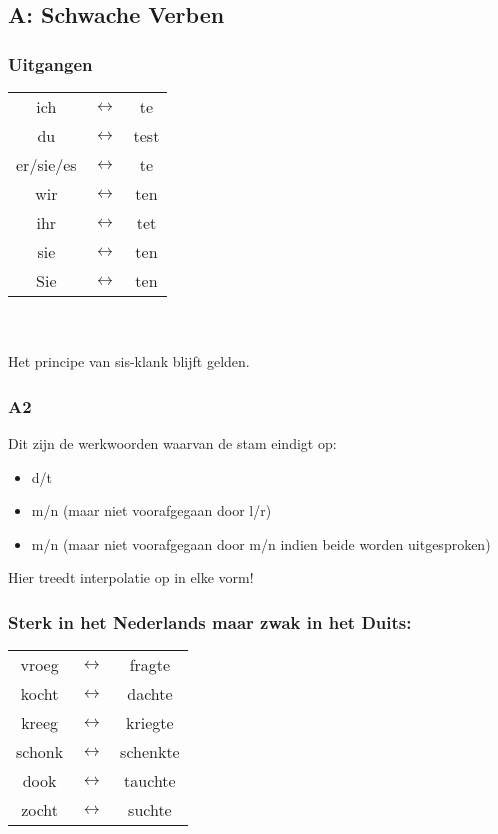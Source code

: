 \documentclass[main.tex]{subfiles}
\begin{document}
\subsection{A: Schwache Verben}
\subsubsection{Uitgangen}
\begin{tabular}{c c c}

ich & $\leftrightarrow$ & te \\ 

du & $\leftrightarrow$ & test \\ 

er/sie/es & $\leftrightarrow$ & te \\ 

wir & $\leftrightarrow$ & ten \\ 

ihr & $\leftrightarrow$ & tet \\ 

sie & $\leftrightarrow$ & ten \\ 
 
Sie & $\leftrightarrow$ & ten \\ 

\end{tabular} \\
\\
Het principe van sis-klank blijft gelden.
\subsubsection{A2}
Dit zijn de werkwoorden waarvan de stam eindigt op:
\begin{itemize}
\item d/t
\item m/n (maar niet voorafgegaan door l/r)
\item m/n (maar niet voorafgegaan door m/n indien beide worden uitgesproken)
\end{itemize}
Hier treedt interpolatie op in elke vorm!

\subsubsection{Sterk in het Nederlands maar zwak in het Duits:}
\begin{tabular}{ccc}
vroeg & $\leftrightarrow$ & fragte \\ 
kocht & $\leftrightarrow$ & dachte \\ 
kreeg & $\leftrightarrow$ & kriegte \\ 
schonk & $\leftrightarrow$ & schenkte \\ 
dook & $\leftrightarrow$ & tauchte \\ 
zocht & $\leftrightarrow$ & suchte \\ 
\end{tabular} 
\end{document}
